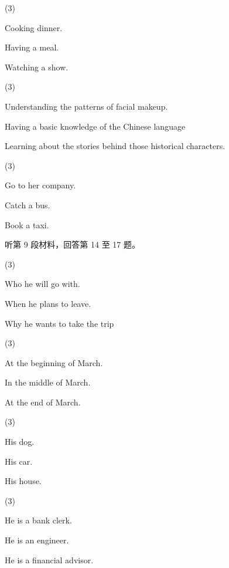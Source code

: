 \documentclass{英语试卷}
\begin{document}
\begin{choices}(3)
  \item Cooking dinner.
  \item Having a meal.
  \item Watching a show.
\end{choices}
\begin{choices}(3)
  \item Understanding the patterns of facial makeup.
  \item Having a basic knowledge of the Chinese language
  \item Learning about the stories behind those historical characters.
\end{choices}
\begin{choices}(3)
  \item Go to her company.
  \item Catch a bus.
  \item Book a taxi.
\end{choices}
\par 听第 9 段材料，回答第 14 至 17 题。\par
{}
\begin{choices}(3)
  \item Who he will go with.
  \item When he plans to leave.
  \item Why he wants to take the trip
\end{choices}
\begin{choices}(3)
  \item At the beginning of March.
  \item In the middle of March.
  \item At the end of March.
\end{choices}
\begin{choices}(3)
  \item His dog.
  \item His car.
  \item His house.
\end{choices}
\begin{choices}(3)
  \item He is a bank clerk.
  \item He is an engineer.
  \item He is a financial advisor.
\end{choices}
\end{document}
